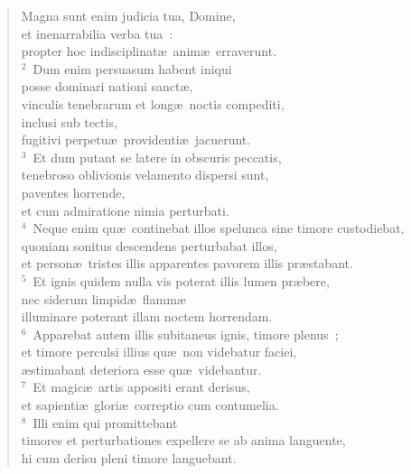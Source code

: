 \begin{flushleft}\begin{verse}\vspace{-19pt}\hspace{6pt}Magna sunt enim judicia tua, Domine,\\\hspace{6pt} et inenarrabilia verba tua~:\\ propter hoc indisciplinat\ae\ anim\ae\ erraverunt.\\
${}^{2}$~Dum enim persuasum habent iniqui\\ posse dominari nationi sanct\ae ,\\ vinculis tenebrarum et long\ae\ noctis compediti,\\ inclusi sub tectis,\\ fugitivi perpetu\ae\ providenti\ae\ jacuerunt.\\
${}^{3}$~Et dum putant se latere in obscuris peccatis,\\ tenebroso oblivionis velamento dispersi sunt,\\ paventes horrende,\\ et cum admiratione nimia perturbati.\\
${}^{4}$~Neque enim qu\ae\ continebat illos spelunca sine timore custodiebat,\\ quoniam sonitus descendens perturbabat illos,\\ et person\ae\ tristes illis apparentes pavorem illis pr\ae stabant.\\
${}^{5}$~Et ignis quidem nulla vis poterat illis lumen pr\ae bere,\\ nec siderum limpid\ae\ flamm\ae \\ illuminare poterant illam noctem horrendam.\\
${}^{6}$~Apparebat autem illis subitaneus ignis, timore plenus~;\\ et timore perculsi illius qu\ae\ non videbatur faciei,\\ \ae stimabant deteriora esse qu\ae\ videbantur.\\
${}^{7}$~Et magic\ae\ artis appositi erant derisus,\\ et sapienti\ae\ glori\ae\ correptio cum contumelia.\\
${}^{8}$~Illi enim qui promittebant\\ timores et perturbationes expellere se ab anima languente,\\ hi cum derisu pleni timore languebant.\\

\end{verse}
\end{flushleft}
